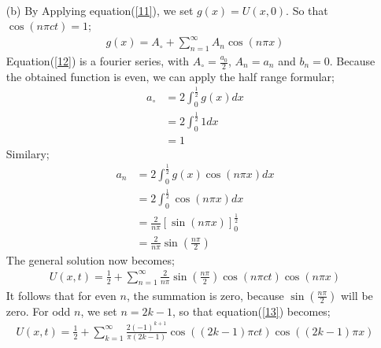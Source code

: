 \documentclass[12pt,a4paper]{article}
\begin{document}
\begin{itemize}
\begin{align}
\end{align}
\item [(b)]
By Applying equation(\ref{11}), we set $g(x)=U(x,0)$. So that $\cos(n\pi ct)=1$;
\begin{align}
g(x)=A_{\circ}+\sum_{n=1}^{\infty}A_{n} \cos(n\pi x) \label{12}
\end{align}
Equation(\ref{12}) is a fourier series, with $A_{\circ}=\frac{a_{0}}{2}$, $A_{n}=a_{n}$ and $b_{n}=0$. Because the obtained function is even, we can apply the half range formular;
\begin{align*}
a_{\circ}&=2\int^{\frac{1}{2}}_{0}g(x)dx\\
&=2\int^{\frac{1}{2}}_{0}1 dx\\
&=1
\end{align*}
Similary;
\begin{align*}
a_{n}&=2\int^{\frac{1}{2}}_{0} g(x)\cos(n\pi x)dx\\
&=2\int^{\frac{1}{2}}_{0}\cos(n\pi x)dx\\
&=\frac{2}{n\pi}\left[\sin(n\pi x)\right]^{\frac{1}{2}}_{0}\\
&=\frac{2}{n\pi}\sin(\frac{n\pi}{2})
\end{align*}
The general solution now becomes;
\begin{align}
U(x,t)=\frac{1}{2}+\sum_{n=1}^{\infty}\frac{2}{n\pi}\sin(\frac{n\pi}{2})\cos(n\pi ct)\cos(n\pi x) \label{13} 
\end{align}
It follows that for even $n$, the summation is zero, because $\sin(\frac{n\pi}{2})$ will be zero. For odd $n$, we set $n=2k-1$, so that equation(\ref{13}) becomes;
\begin{align*}
U(x,t)=\frac{1}{2}+\sum_{k=1}^{\infty}\frac{2(-1)^{k+1}}{\pi(2k-1)}\cos((2k-1)\pi ct)\cos((2k-1)\pi x)
\end{align*}
\end{itemize}
\newpage
\end{document}
